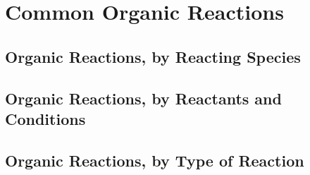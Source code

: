 \documentclass[../main]{subfiles}
\begin{document}
\section{Common Organic Reactions}
	
	\subsection{Organic Reactions, by Reacting Species}

	\subsection{Organic Reactions, by Reactants and Conditions}

	\subsection{Organic Reactions, by Type of Reaction}
	
\end{document}
